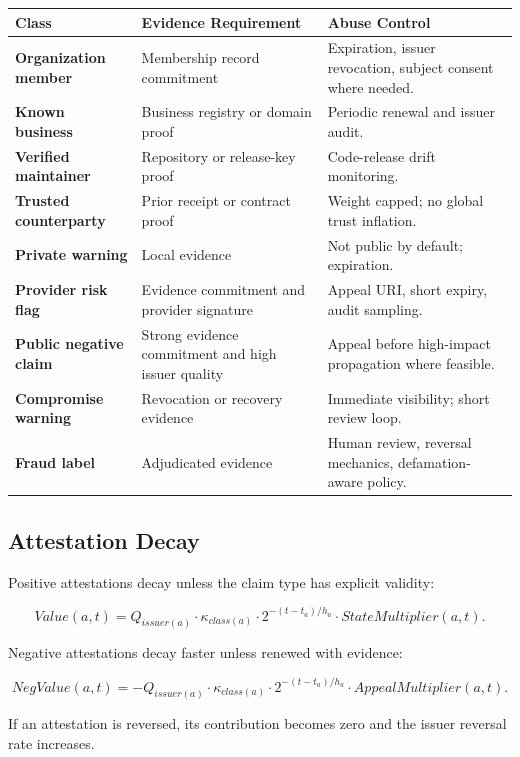 \documentclass[11pt]{article}
\begin{document}
\begin{longtable}{>{\bfseries}p{} p{} p{}}
\toprule
Class & Evidence Requirement & Abuse Control \\
\midrule
Organization member & Membership record commitment & Expiration, issuer revocation, subject consent where needed. \\
Known business & Business registry or domain proof & Periodic renewal and issuer audit. \\
Verified maintainer & Repository or release-key proof & Code-release drift monitoring. \\
Trusted counterparty & Prior receipt or contract proof & Weight capped; no global trust inflation. \\
Private warning & Local evidence & Not public by default; expiration. \\
Provider risk flag & Evidence commitment and provider signature & Appeal URI, short expiry, audit sampling. \\
Public negative claim & Strong evidence commitment and high issuer quality & Appeal before high-impact propagation where feasible. \\
Compromise warning & Revocation or recovery evidence & Immediate visibility; short review loop. \\
Fraud label & Adjudicated evidence & Human review, reversal mechanics, defamation-aware policy. \\
\bottomrule
\end{longtable}

\subsection{Attestation Decay}

Positive attestations decay unless the claim type has explicit validity:

\begin{equation}
Value(a,t)=Q_{issuer(a)}\cdot \kappa_{class(a)}\cdot 2^{-(t-t_a)/h_a}\cdot StateMultiplier(a,t).
\end{equation}

Negative attestations decay faster unless renewed with evidence:

\begin{equation}
NegValue(a,t)=-Q_{issuer(a)}\cdot \kappa_{class(a)}\cdot 2^{-(t-t_a)/h_a}\cdot AppealMultiplier(a,t).
\end{equation}

If an attestation is reversed, its contribution becomes zero and the issuer reversal rate increases.
\end{document}

